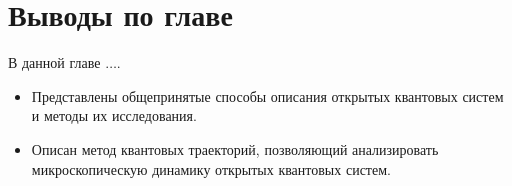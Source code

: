 \section{Выводы по главе}\label{sec:ch1/results}
В данной главе $\ldots$.
\begin{itemize}[beginpenalty=10000] %
	\item Представлены общепринятые способы описания открытых квантовых систем и методы их исследования.
	\item Описан метод квантовых траекторий, позволяющий анализировать микроскопическую динамику открытых квантовых систем. 
\end{itemize}





%
%
